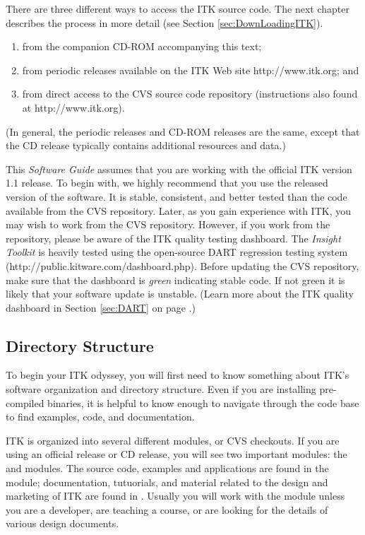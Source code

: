 There are three different ways to access the ITK source code. The next
chapter describes the process in more detail (see Section 
\ref{sec:DownLoadingITK}).
\begin{enumerate}
	\item	from the companion CD-ROM accompanying this text;
	\item	from periodic releases available on the ITK Web site 
                http://www.itk.org; and
	\item	from direct access to the CVS source code repository 
                (instructions also found at http://www.itk.org).
\end{enumerate}
(In general, the periodic releases and CD-ROM releases are the same, except
that the CD release typically contains additional resources and data.)

This \emph{Software Guide} assumes that you are working with the official ITK
version 1.1 release. To begin with, we highly recommend that you use the
released version of the software. It is stable, consistent, and better tested
than the code available from the CVS repository. Later, as you gain
experience with ITK, you may wish to work from the CVS repository. However,
if you work from the repository, please be aware of the ITK quality testing
dashboard. The \emph{Insight Toolkit} is heavily tested using the open-source
DART regression testing system
(http://public.kitware.com/dashboard.php). Before updating the CVS
repository, make sure that the dashboard is \emph{green} indicating stable
code. If not green it is likely that your software update is unstable. (Learn
more about the ITK quality dashboard in Section
\ref{sec:DART} on page \pageref{sec:DART}.)


\subsection{Directory Structure}
\label{sec:DirectoryStructure}

To begin your ITK odyssey, you will first need to know something about ITK's
software organization and directory structure. Even if you are installing
pre-compiled binaries, it is helpful to know enough to navigate through the
code base to find examples, code, and documentation.

ITK is organized into several different modules, or CVS checkouts. If you are
using an official release or CD release, you will see two important modules:
the  and  modules. The source code,
examples and applications are found in the  module;
documentation, tutuorials, and material related to the design and marketing
of ITK are found in . Usually you will work with the 
 module unless you are a developer, are teaching a course, or
are looking for the details of various design documents.

